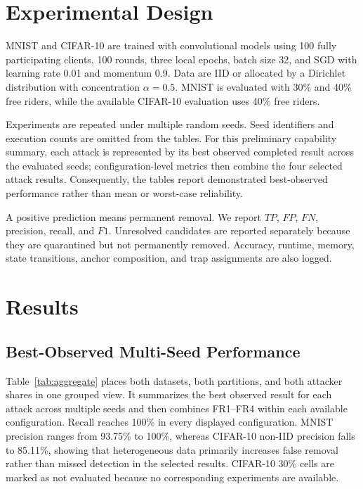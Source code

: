 \documentclass[conference]{IEEEtran}
\begin{document}
\section{Experimental Design}
MNIST \cite{lecun1998gradient} and CIFAR-10 \cite{krizhevsky2009learning} are trained with convolutional models using 100 fully participating clients, 100 rounds, three local epochs, batch size 32, and SGD with learning rate 0.01 and momentum 0.9. Data are IID or allocated by a Dirichlet distribution with concentration $\alpha=0.5$. MNIST is evaluated with 30\% and 40\% free riders, while the available CIFAR-10 evaluation uses 40\% free riders.

Experiments are repeated under multiple random seeds. Seed identifiers and execution counts are omitted from the tables. For this preliminary capability summary, each attack is represented by its best observed completed result across the evaluated seeds; configuration-level metrics then combine the four selected attack results. Consequently, the tables report demonstrated best-observed performance rather than mean or worst-case reliability.

A positive prediction means permanent removal. We report $TP$, $FP$, $FN$, precision, recall, and $F1$. Unresolved candidates are reported separately because they are quarantined but not permanently removed. Accuracy, runtime, memory, state transitions, anchor composition, and trap assignments are also logged.

\section{Results}
\subsection{Best-Observed Multi-Seed Performance}
Table~\ref{tab:aggregate} places both datasets, both partitions, and both attacker shares in one grouped view. It summarizes the best observed result for each attack across multiple seeds and then combines FR1--FR4 within each available configuration. Recall reaches 100\% in every displayed configuration. MNIST precision ranges from 93.75\% to 100\%, whereas CIFAR-10 non-IID precision falls to 85.11\%, showing that heterogeneous data primarily increases false removal rather than missed detection in the selected results. CIFAR-10 30\% cells are marked as not evaluated because no corresponding experiments are available.
\end{document}
